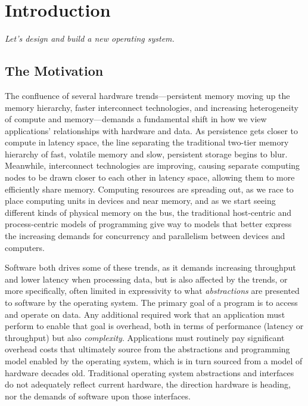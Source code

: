 
\chapter{Introduction}\label{ch:intro}

\emph{Let's design and build a new operating system.}

\section*{The Motivation}

The confluence of several hardware trends---persistent memory moving up the memory hierarchy, faster interconnect
technologies, and increasing heterogeneity of compute and memory---demands a fundamental shift in how we view
applications' relationships with hardware and data. As persistence gets closer to compute in latency space, the line separating the traditional two-tier
memory hierarchy of fast, volatile memory and slow, persistent storage begins to blur. Meanwhile, interconnect technologies
are improving, causing separate computing nodes to be drawn closer to each other in latency space, allowing them to more efficiently
share memory. Computing resources are spreading out, as we race to place computing units in devices and near memory, and as
we start seeing different kinds of physical memory on the bus, the traditional host-centric and process-centric models
of programming give way to models that better express the increasing demands for concurrency and parallelism between
devices and computers.

Software both drives some of these trends, as it demands increasing throughput and lower latency when processing data,
but is also affected by the trends, or more specifically, often limited in expressivity to what \emph{abstractions} are
presented to software by the operating system. The primary goal of a program is to access and operate on data. Any
additional required work that an application must perform to enable that goal is overhead, both in terms of performance
(latency or throughput) but also \emph{complexity}. Applications must routinely pay significant overhead costs that
ultimately source from the abstractions and programming model enabled by the operating system, which is in turn sourced
from a model of hardware decades old.
Traditional operating system abstractions and interfaces do not adequately reflect current hardware, the direction hardware is
heading, nor the demands of software upon those interfaces.

